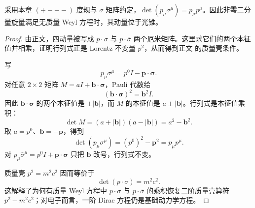 \begin{proposition}
采用本章 $(+---)$ 度规与 $\sigma$ 矩阵约定，$\det(p_\mu\sigma^\mu)=p_\mu p^\mu$。因此非零二分量旋量满足无质量 Weyl 方程时，其动量位于光锥。
\end{proposition}
\begin{proof}
由正文，四动量被写成 $p\cdot\sigma$ 与 $p\cdot\bar\sigma$ 两个厄米矩阵。这里求它们的两个本征值并相乘，证明行列式正是 Lorentz 不变量 $p^2$，从而得到正文 的质量壳条件。



写
\begin{equation*}
 p_\mu\sigma^\mu=p^0I-\mathbf p\cdot\boldsymbol\sigma.
\end{equation*}
对任意 $2\times2$ 矩阵 $M=aI+\mathbf b\cdot\boldsymbol\sigma$，Pauli 代数给
\begin{equation*}
 (\mathbf b\cdot\boldsymbol\sigma)^2=\mathbf b^2I.
\end{equation*}
因此 $\mathbf b\cdot\boldsymbol\sigma$ 的两个本征值是 $\pm|\mathbf b|$，而 $M$ 的本征值是 $a\pm|\mathbf b|$。行列式是本征值乘积：
\begin{equation*}
 \det M=(a+|\mathbf b|)(a-|\mathbf b|)=a^2-\mathbf b^2.
\end{equation*}
取 $a=p^0$、$\mathbf b=-\mathbf p$，得到
\begin{equation*}
 \det(p_\mu\sigma^\mu)
 =(p^0)^2-\mathbf p^2=p_\mu p^\mu.
\end{equation*}
对 $p_\mu\bar\sigma^\mu=p^0I+\mathbf p\cdot\boldsymbol\sigma$ 只把 $\mathbf b$ 改号，行列式不变。

质量壳 $p^2=m^2c^2$ 因而等价于
\begin{equation*}
 \det(p\cdot\sigma)=m^2c^2.
\end{equation*}
这解释了为何有质量 Weyl 方程中 $p\cdot\sigma$ 与 $p\cdot\bar\sigma$ 的乘积恢复二阶质量壳算符 $p^2-m^2c^2$；对电子而言，一阶 Dirac 方程仍是基础动力学方程。
\end{proof}

